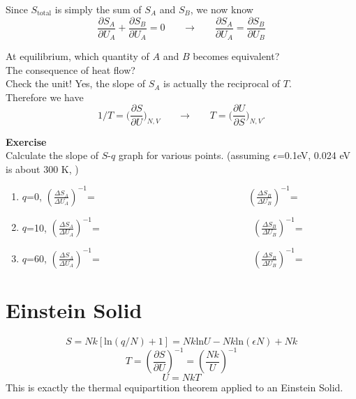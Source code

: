 Since $S_\text{total}$ is simply the sum of $S_A$ and $S_B$, we now know
\begin{equation} \label{entropy} 
\frac {\partial{S_A}} {\partial{U_A}} +  \frac {\partial{S_B}} {\partial{U_A}} =0     ~~~~~~~~ \rightarrow~~~~~~~~  
\frac {\partial{S_A}} {\partial{U_A}} =  \frac {\partial{S_B}} {\partial{U_B}} 
\end{equation}

At equilibrium, which quantity of $A$ and $B$ becomes equivalent? \\
The consequence of heat flow?\\
Check the unit! Yes, the slope of $S_A$ is actually the reciprocal of $T$.\\
Therefore we have
\begin{equation} 
1/T = \Bigg(\frac {\partial{S}} {\partial{U}}\Bigg)_{N, V} ~~~~~~~~ \rightarrow~~~~~~~~ T = \Bigg(\frac {\partial{U}} {\partial{S}}\Bigg)_{N, V}.
\end{equation}

{\bf Exercise}\\
Calculate the slope of $S$-$q$ graph for various points. (assuming $\epsilon$=0.1eV, 0.024 eV is about 300 K, )\\
\begin{enumerate}
\item $q$=0,  $(\frac {\Delta{S_A}} {\Delta{U_A}})^{-1}$=  ~~~~~~~~~~~~~~~~~~~~~~~~~~~~~~  $(\frac {\Delta{S_B}} {\Delta{U_B}})^{-1}$= 
\item $q$=10, $(\frac {\Delta{S_A}} {\Delta{U_A}})^{-1}$=  ~~~~~~~~~~~~~~~~~~~~~~~~~~~~~~  $(\frac {\Delta{S_B}} {\Delta{U_B}})^{-1}$= 
\item $q$=60, $(\frac {\Delta{S_A}} {\Delta{U_A}})^{-1}$=  ~~~~~~~~~~~~~~~~~~~~~~~~~~~~~~  $(\frac {\Delta{S_B}} {\Delta{U_B}})^{-1}$= 
\end{enumerate}

\section{Einstein Solid}

\begin{equation} S = Nk[\text{ln}(q/N)+1] = Nk\text{ln}U - Nk\text{ln}(\epsilon N) + Nk \end{equation}
\begin{equation} T = (\frac {\partial{S}} {\partial{U}})^{-1} = (\frac{Nk}{U})^{-1}\end{equation}
\begin{equation} U = NkT \end{equation}
This is exactly the thermal equipartition theorem applied to an Einstein Solid.

